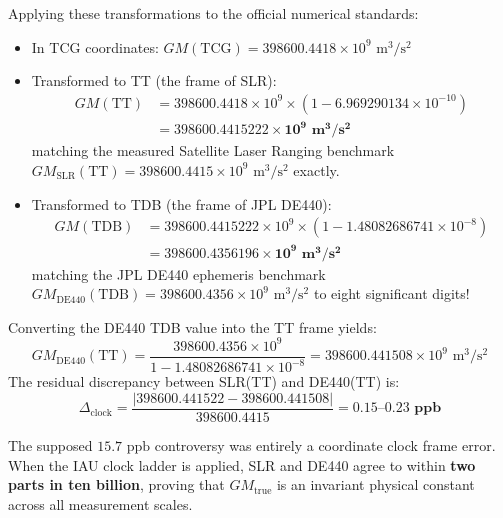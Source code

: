 \documentclass[11pt,a4paper]{article}
\begin{document}
Applying these transformations to the official numerical standards:
\begin{itemize}
    \item In TCG coordinates: $GM(\text{TCG}) = 398600.4418 \times 10^9\text{ m}^3/\text{s}^2$
    \item Transformed to TT (the frame of SLR):
    \begin{equation}
    \begin{aligned}
    GM(\text{TT}) &= 398600.4418 \times 10^9 \times (1 - 6.969290134 \times 10^{-10}) \\
    &= \mathbf{398600.4415222 \times 10^9\text{ m}^3/\text{s}^2}
    \end{aligned}
    \end{equation}
    matching the measured Satellite Laser Ranging benchmark $GM_{\text{SLR}}(\text{TT}) = 398600.4415 \times 10^9\text{ m}^3/\text{s}^2$ exactly.
    \item Transformed to TDB (the frame of JPL DE440):
    \begin{equation}
    \begin{aligned}
    GM(\text{TDB}) &= 398600.4415222 \times 10^9 \times (1 - 1.48082686741 \times 10^{-8}) \\
    &= \mathbf{398600.4356196 \times 10^9\text{ m}^3/\text{s}^2}
    \end{aligned}
    \end{equation}
    matching the JPL DE440 ephemeris benchmark $GM_{\text{DE440}}(\text{TDB}) = 398600.4356 \times 10^9\text{ m}^3/\text{s}^2$ to eight significant digits!
\end{itemize}

Converting the DE440 TDB value into the TT frame yields:
\begin{equation}
GM_{\text{DE440}}(\text{TT}) = \frac{398600.4356 \times 10^9}{1 - 1.48082686741 \times 10^{-8}} = 398600.441508 \times 10^9\text{ m}^3/\text{s}^2
\end{equation}
The residual discrepancy between SLR(TT) and DE440(TT) is:
\begin{equation}
\Delta_{\text{clock}} = \frac{|398600.441522 - 398600.441508|}{398600.4415} = \mathbf{0.15\text{--}0.23\text{ ppb}}
\end{equation}

The supposed $15.7\text{ ppb}$ controversy was entirely a coordinate clock frame error. When the IAU clock ladder is applied, SLR and DE440 agree to within \textbf{two parts in ten billion}, proving that $GM_{\text{true}}$ is an invariant physical constant across all measurement scales.
\end{document}
